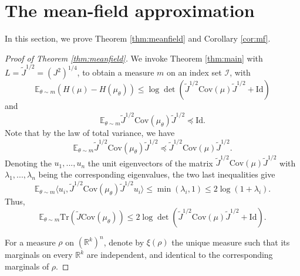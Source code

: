 \documentclass[12pt]{article}
\def \RR {\mathbb R}
\def \Tr {\mathrm{Tr}}
\def \EE {\mathbb E}
\def \Cov {\mathrm {Cov}}
\def \Id {\mathrm{Id}}
\def \Cov {\mathrm{Cov}}
\theoremstyle{definition}
\theoremstyle{remark}
\begin{document}
\section{The mean-field approximation}

In this section, we prove Theorem \ref{thm:meanfield} and Corollary \ref{cor:mf}.
\begin{proof}[Proof of Theorem \ref{thm:meanfield}]
	We invoke Theorem \ref{thm:main} with $L = \tilde J^{1/2} = (J^2)^{1/4}$, to obtain a measure $m$ on an index set $\mathcal{I}$, with 
	\begin{equation}\label{eq:Hest1}
	\EE_{\theta \sim m} \left (H(\mu) - H(\mu_\theta) \right ) \leq \log \det \left  (\tilde J^{1/2} \Cov(\mu) \tilde J^{1/2} + \Id \right )
	\end{equation}
	and
	$$
	\EE_{\theta \sim m} \tilde J^{1/2} \Cov(\mu_\theta) \tilde J^{1/2} \preceq \Id.
	$$
	Note that by the law of total variance, we have 
	$$
	\EE_{\theta \sim m} \tilde J^{1/2} \Cov(\mu_\theta) \tilde J^{1/2} \preceq \tilde J^{1/2} \Cov(\mu) \tilde J^{1/2}.
	$$ 
	Denoting the $u_1,...,u_n$ the unit eigenvectors of the matrix $\tilde J^{1/2} \Cov(\mu) \tilde J^{1/2}$ with $\lambda_1,...,\lambda_n$ being the corresponding eigenvalues, the two last inequalities give
	$$
	\EE_{\theta \sim m} \langle u_i, \tilde J^{1/2} \Cov(\mu_\theta) \tilde J^{1/2} u_i \rangle \leq \min(\lambda_i, 1) \leq 2 \log (1 + \lambda_i).
	$$
	Thus,
	\begin{equation}\label{eq:Hest2}
	\EE_{\theta \sim m} \Tr( \tilde J \Cov(\mu_\theta) ) \leq 2 \log \det (\tilde J^{1/2} \Cov(\mu) \tilde J^{1/2} + \Id).
	\end{equation}	
	
	For a measure $\rho$ on $(\RR^k)^n$, denote by $\xi(\rho)$ the unique measure such that its marginals on every $\RR^k$ are independent, and identical to the corresponding marginals of $\rho$. 
	

\end{proof}
\end{document}
